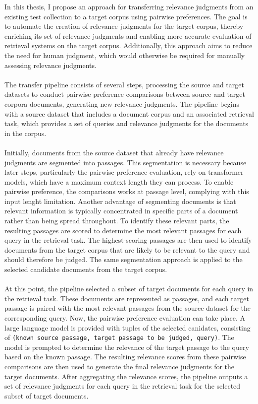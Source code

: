 In this thesis, I propose an approach for transferring relevance judgments from an existing test collection to a target corpus using pairwise preferences. The goal is to automate the creation of relevance judgments for the target corpus, thereby enriching its set of relevance judgments and enabling more accurate evaluation of retrieval systems on the target corpus. Additionally, this approach aims to reduce the need for human judgment, which would otherwise be \mbox{required} for manually assessing relevance judgments.
\\\\
The transfer pipeline consists of several steps, processing the source and target datasets to conduct pairwise preference comparisons between source and target corpora documents, generating new relevance judgments. The pipeline begins with a source dataset that includes a document corpus and an associated retrieval task, which provides a set of queries and relevance judgments for the documents in the corpus.
\\\\
Initially, documents from the source dataset that already have relevance judgments are segmented into passages. This segmentation is necessary because later steps, particularly the pairwise preference evaluation, rely on transformer models, which have a maximum context length they can process. To enable pairwise preference, the comparisons works at passage level, complying with this input lenght limitation. Another advantage of segmenting documents is that relevant information is typically concentrated in specific parts of a document rather than being spread throughout. To identify these relevant parts, the resulting passages are scored to determine the most relevant passages for each query in the retrieval task. The highest-scoring passages are then used to identify documents from the target corpus that are likely to be relevant to the query and should therefore be judged. The same segmentation approach is applied to the selected candidate documents from the target corpus.
\\\\
At this point, the pipeline selected a subset of target documents for each query in the retrieval task. These documents are represented as passages, and each target passage is paired with the most relevant passages from the source dataset for the corresponding query. Now, the pairwise preference evaluation can take place. A large language model is provided with tuples of the selected canidates, consisting of \texttt{(known source passage, target passage to be judged, query)}. The model is prompted to determine the relevance of the target passage to the query based on the known passage. The resulting relevance scores from these pairwise comparisons are then used to generate the final relevance judgments for the target documents. After aggregating the relevance scores, the pipeline outputs a set of relevance judgments for each query in the retrieval task for the selected subset of target documents.
